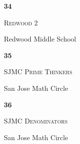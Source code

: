 \documentclass[extrafontsizes,30pt]{memoir}
\begin{document}
\renewcommand{\TeamID}{34}
\renewcommand{\TeamName}{Redwood 2}
\renewcommand{\SchoolName}{Redwood Middle School}

\begin{center}
\mbox{}
\vspace{1in}

{\Huge \textbf{ \TeamID}}

\vspace{1in}

{\Large \textsc{\TeamName}}

\vspace{1in}

{\large \SchoolName}
\end{center}

\newpage



\renewcommand{\TeamID}{35}
\renewcommand{\TeamName}{SJMC Prime Thinkers}
\renewcommand{\SchoolName}{San Jose Math Circle}

\begin{center}
\mbox{}
\vspace{1in}

{\Huge \textbf{ \TeamID}}

\vspace{1in}

{\Large \textsc{\TeamName}}

\vspace{1in}

{\large \SchoolName}
\end{center}

\newpage



\renewcommand{\TeamID}{36}
\renewcommand{\TeamName}{SJMC Denominators}
\renewcommand{\SchoolName}{San Jose Math Circle}

\begin{center}
\mbox{}
\vspace{1in}

{\Huge \textbf{ \TeamID}}

\vspace{1in}

{\Large \textsc{\TeamName}}

\vspace{1in}

{\large \SchoolName}
\end{center}

\newpage



\renewcommand{\TeamID}{37}
\renewcommand{\TeamName}{Blazers}
\renewcommand{\SchoolName}{Sierra Canyon}
\end{document}
